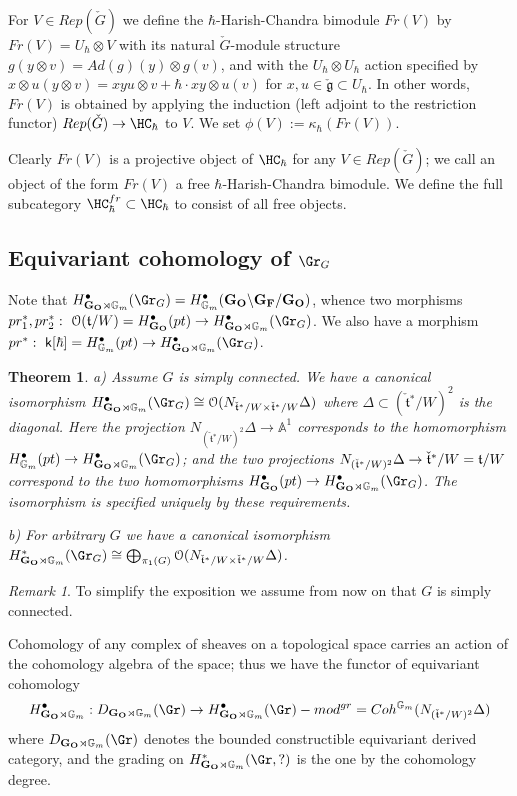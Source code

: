 \documentclass[11pt]{amsart}
\newtheorem{thm}{Theorem}
\theoremstyle{definition}
\theoremstyle{remark}
\renewcommand{\O}{{\mathcal O}}
\theoremstyle{remark}
\newtheorem{Rem}{Remark}
\newcommand{\cal}{\mathcal}
\newcommand{\bu}{\bullet}
\newcommand{\<}{\langle}
\renewcommand{\>}{\rangle}
\renewcommand{\t}{{\frak t}}
\newcommand{\Lg}{\check{\mathfrak g}{}}
\newcommand{\Lt}{\check{\mathfrak t}{}}
\newcommand{\LG}{{\check{G}}}
\renewcommand{\O}{{\cal O}}
\newcommand{\GO}{{\bf G_O}}
\newcommand{\GF}{{\bf G_F}}
\newcommand{\Aone}{{\mathbb A}^1}
\newcommand{\Gm}{{{\mathbb G}_m}}
\newcommand{\HCh}{\HC_\hbar}
\newcommand{\HChfr}{\HC_\hbar^{fr}}
\newcommand{\kk}{\mathsf k}
\begin{document}
For $V\in Rep(\LG)$ we define the $\hbar$-Harish-Chandra bimodule
$Fr(V)$ by $Fr(V)=U_\hbar\otimes V$ with its natural $\LG$-module
structure $g(y\otimes v)=Ad(g)(y)\otimes g(v)$, and with the
$U_\hbar \otimes U_\hbar$ action specified by $x\otimes u(y\otimes
v)= xyu\otimes v +\hbar\cdot xy \otimes u(v)$ for $x,u\in \Lg
\subset U_\hbar$. In other words, $Fr(V)$ is obtained by applying the induction
(left adjoint to the restriction functor) $Rep(\LG)\to \HCh$ to $V$.
We set $\phi(V):=\kappa_\hbar(Fr(V))$.

 Clearly  $Fr(V)$ is a projective object of
$\HCh$ for any $V\in Rep(\LG)$; we call an object of the form
$Fr(V)$ a free $\hbar$-Harish-Chandra bimodule. We define the full
subcategory  $\HChfr\subset \HCh$ to consist of all free objects.



\subsection{Equivariant cohomology of $\Gr_G$}

Note that $H^\bullet_{\GO\rtimes\Gm}(\Gr_G)=
H^\bullet_{\Gm}(\GO\backslash\GF/\GO)$,
whence two morphisms $pr_1^*, pr_2^*:\ \O(\t/W)=H^\bullet_\GO(pt)\to
H^\bullet_{\GO \rtimes \Gm}(\Gr_G)$.
We also have a morphism $pr^*:\ \kk[\hbar]=H^\bullet_\Gm(pt)\to
H^\bullet_{\GO \rtimes \Gm}(\Gr_G)$.


\begin{thm}
\label{normocon}
a) Assume $G$ is simply connected. 
We have a canonical isomorphism $H^\bullet_{\GO \rtimes \Gm}(\Gr_G)\cong
\O(N_{\Lt^*/W\times \Lt^*/W}\Delta)$ where $\Delta \subset (\Lt^*/W)^2$ is
the diagonal. Here the projection $N_{ (\Lt^*/W)^2}\Delta\to \Aone$
corresponds to the homomorphism $H_{\Gm}^\bu(pt)\to H^\bu_{\GO
\rtimes \Gm} (\Gr_G)$; and the two projections $N_{ (\Lt^*/W)^2}\Delta
\to \Lt^*/W=\t/W$ correspond to the two homomorphisms
$H_{\GO}^\bu(pt)\to H^\bu_{\GO
\rtimes \Gm} (\Gr_G)$. The isomorphism is specified uniquely
 by these requirements.

b) For arbitrary $G$ we have a canonical isomorphism
$H^*_{\GO \rtimes \Gm}(\Gr_G)\cong\bigoplus_{\pi_1(G)}\O(N_{\Lt^*/W\times \Lt^*/W}\Delta)$.
\end{thm}

\begin{Rem}
To simplify the exposition we assume from now on that $G$ is simply
connected. 
\end{Rem}

Cohomology of any complex of sheaves on a topological space
carries an action of the cohomology algebra of the space; thus we have
the functor of equivariant cohomology
$$H_{\GO\rtimes\Gm}^\bullet: D_{\GO\rtimes\Gm}(\Gr)\to 
H^\bullet_{\GO\rtimes\Gm}(\Gr)
-mod^{gr} = Coh^{\Gm}(N_{(\Lt^*/W)^2}\Delta)$$ 
where $D_{\GO\rtimes\Gm}(\Gr)$ denotes the bounded constructible
equivariant derived category, and the grading on 
$H^*_{\GO\rtimes\Gm}(\Gr,?)$ is the one by the cohomology degree. 
\end{document}
